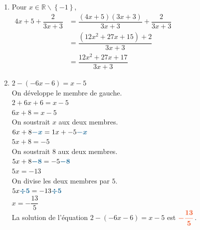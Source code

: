 \documentclass[a4paper,11pt]{article}
\begin{document}
{\begin{seanceD}{}
\begin{enumerate}
\item Pour $x\in \mathbb{R}\smallsetminus\left\{-1\right\}$, \\
            $\begin{aligned}
            4x+5+\dfrac{2}{3x+3}
           & = \dfrac{(4x+5)(3x+3)}{3x+3}+\dfrac{2}{3x+3}\\
            &=\dfrac{(12x^2+27x+15)+2}{3x+3}\\
           & =\dfrac{12x^2+27x+17}{3x+3}
           \end{aligned}$
\item $2-(-6x-6)=x-5$\\On développe le membre de gauche.\\$2+6x+6=x-5$\\$6x+8=x-5$\\On soustrait $x$ aux deux membres.\\$6x+8{\color[HTML]{216D9A}\boldsymbol{-x}}=1x+-5{\color[HTML]{216D9A}\boldsymbol{-x}}$\\$5x+8=-5$\\On soustrait $8$ aux deux membres.\\$5x+8{\color[HTML]{216D9A}\boldsymbol{-8}}=-5{\color[HTML]{216D9A}\boldsymbol{-8}}$\\$5x=-13$\\On divise les deux membres par $5$.\\$5x{\color[HTML]{216D9A}\boldsymbol{\div5}}=-13{\color[HTML]{216D9A}\boldsymbol{\div5}}$\\$x=-\dfrac{13}{5}$\\La solution de l'équation $2-(-6x-6)=x-5$ est ${\color[HTML]{f15929}\boldsymbol{-\dfrac{13}{5}}}$.
\end{enumerate}
\end{seanceD}}
\end{document}
